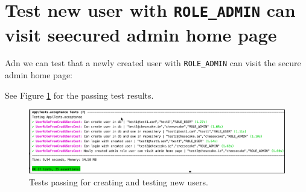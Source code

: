 \documentclass[a4paperpaper,openright]{book}
\newenvironment{Shaded}{}{}
\newcommand{\AnnotationTok}[1]{\textcolor[rgb]{0.38,0.63,0.69}{\textbf{\textit{#1}}}}
\newcommand{\CommentTok}[1]{\textcolor[rgb]{0.38,0.63,0.69}{\textit{#1}}}
\newcommand{\CommentVarTok}[1]{\textcolor[rgb]{0.38,0.63,0.69}{\textbf{\textit{#1}}}}
\newcommand{\KeywordTok}[1]{\textcolor[rgb]{0.00,0.44,0.13}{\textbf{#1}}}
\newcommand{\NormalTok}[1]{#1}
\newcommand{\OtherTok}[1]{\textcolor[rgb]{0.00,0.44,0.13}{#1}}
\newcommand{\StringTok}[1]{\textcolor[rgb]{0.25,0.44,0.63}{#1}}
\begin{document}
\hypertarget{test-new-user-with-role_admin-can-visit-seecured-admin-home-page}{%
\section{\texorpdfstring{Test new user with \texttt{ROLE\_ADMIN} can
visit seecured admin home
page}{Test new user with ROLE\_ADMIN can visit seecured admin home page}}\label{test-new-user-with-role_admin-can-visit-seecured-admin-home-page}}

Adn we can test that a newly created user with \texttt{ROLE\_ADMIN} can
visit the secure admin home page:

\begin{Shaded}
\end{Shaded}

See Figure \ref{newUserTests} for the passing test results.

\begin{figure}
\centering
\includegraphics{./tex2pdf.-8aed53dcd332a606/f1b6a171b6197e2e3bd9905c29ac3cfa83785099.png}
\caption{Tests passing for creating and testing new users.
\label{newUserTests}}
\end{figure}
\end{document}

